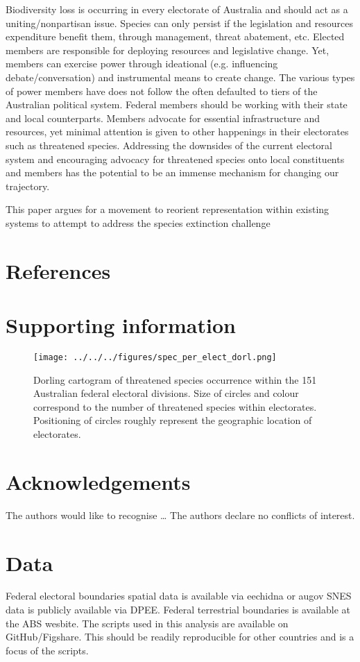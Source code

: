 \documentclass[a4paper,11pt]{article}
\begin{document}
Biodiversity loss is occurring in every electorate of Australia and should act as a uniting/nonpartisan issue. Species can only persist if the legislation and resources expenditure benefit them, through management, threat abatement, etc. Elected members are responsible for deploying resources and legislative change. Yet, members can exercise power through ideational (e.g. influencing debate/conversation) and instrumental means to create change. The various types of power members have does not follow the often defaulted to tiers of the Australian political system. Federal members should be working with their state and local counterparts. Members advocate for essential infrastructure and resources, yet minimal attention is given to other happenings in their electorates such as threatened species. Addressing the downsides of the current electoral system and encouraging advocacy for threatened species onto local constituents and members has the potential to be an immense mechanism for changing our trajectory.

This paper argues for a movement to reorient representation within existing systems to attempt to address the species extinction challenge \cite{burkeSpeciesBordersPolitical2020}

\newpage
\nolinenumbers
\section{References}
\printbibliography

\newpage
\section{Supporting information}

\begin{figure}[H]
	\centering
    \texttt{[image: ../../../figures/spec\_per\_elect\_dorl.png]}
    \caption{Dorling cartogram of threatened species occurrence within the 151 Australian federal electoral divisions. Size of circles and colour correspond to the number of threatened species within electorates. Positioning of circles roughly represent the geographic location of electorates.}
    \label{fig:dorl}
\end{figure}

\newpage
\section{Acknowledgements}
The authors would like to recognise \ldots
The authors declare no conflicts of interest.

\newpage
\section{Data}
Federal electoral boundaries spatial data is available via eechidna or augov
SNES data is publicly available via DPEE.
Federal terrestrial boundaries is available at the ABS wesbite.
The scripts used in this analysis are available on GitHub/Figshare. This should be readily reproducible for other countries and is a focus of the scripts.
\end{document}

